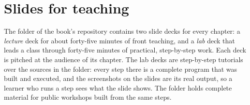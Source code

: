 \section*{Slides for teaching}

The  folder of the book's repository contains two slide
decks for every chapter: a \emph{lecture} deck for about forty-five minutes of
front teaching, and a \emph{lab} deck that leads a class through forty-five
minutes of practical, step-by-step work. Each deck is pitched at the audience of
its chapter. The lab decks are step-by-step tutorials over the sources in the
 folder: every step there is a complete program that was built
and executed, and the screenshots on the slides are its real output, so a
learner who runs a step sees what the slide shows. The 
folder holds complete material for public workshops built from the same
steps.
